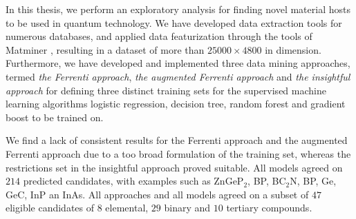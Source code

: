 In this thesis, we perform an exploratory analysis for finding novel material hosts to be used in quantum technology. We have developed data extraction tools for numerous databases, and applied data featurization through the tools of Matminer \cite{Ward2018}, resulting in a dataset of more than $25000\times4800$ in dimension. Furthermore, we have developed and implemented three data mining approaches, termed \textit{the Ferrenti approach}, \textit{the augmented Ferrenti approach} and \textit{the insightful approach} for defining three distinct training sets for the supervised machine learning algorithms logistic regression, decision tree, random forest and gradient boost to be trained on.

We find a lack of consistent results for the Ferrenti approach and the augmented Ferrenti approach due to a too broad formulation of the training set, whereas the restrictions set in the insightful approach proved suitable. All models agreed on $214$ predicted candidates, with examples such as ZnGeP$_2$, BP, BC$_2$N, BP, Ge, GeC, InP an InAs. All approaches and all models agreed on a subset of $47$ eligible candidates of $8$ elemental, $29$ binary and $10$ tertiary compounds. 

